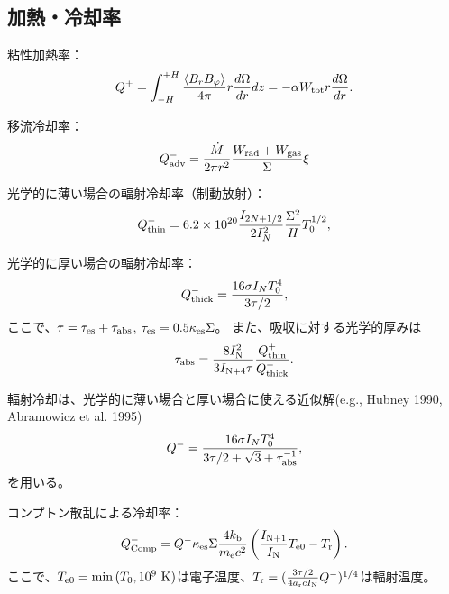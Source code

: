 \documentclass[11pt, oneside]{article}   	%
\begin{document}
\subsection{加熱・冷却率}
粘性加熱率：
\begin{equation}
	Q^+ = \int^{+H}_{-H} \frac{\langle B_rB_\varphi \rangle}{4\pi} r\frac{d\Omega}{dr} dz = -\alpha W_{\rm tot}r\frac{d\Omega}{dr}.
\end{equation}

移流冷却率：
\begin{equation}
	Q^-_{\rm adv} = \frac{\dot{M}}{2\pi r^2} \frac{W_{\rm rad}+W_{\rm gas}}{\Sigma}\xi
\end{equation}

光学的に薄い場合の輻射冷却率（制動放射）：
\begin{equation}
	Q^-_{\rm thin} = 6.2\times10^{20}\frac{I_{2N+1/2}}{2I_N^2}\frac{\Sigma^2}{H}T_0^{1/2},
\end{equation}

光学的に厚い場合の輻射冷却率：
\begin{equation}
	Q^-_{\rm thick} = \frac{16\sigma I_NT_0^4}{3\tau/2},
\end{equation}
ここで、$\tau=\tau_{\rm es}+\tau_{\rm abs}$, $\tau_{\rm es}=0.5\kappa_{\rm es}\Sigma$。
また、吸収に対する光学的厚みは
\begin{equation}
	\tau_{\rm abs} = \frac{8I_{\rm N}^2}{3I_{\rm N+4}\tau}\frac{Q^+_{\rm thin}}{Q^-_{\rm thick}}.
\end{equation}

輻射冷却は、光学的に薄い場合と厚い場合に使える近似解(e.g., Hubney 1990, Abramowicz et al. 1995)
\begin{equation}
	Q^- = \frac{16\sigma I_N T^4_0}{3\tau/2 + \sqrt{3} + \tau_{\rm abs}^{-1}},
\end{equation}
を用いる。

コンプトン散乱による冷却率：
\begin{equation}
	Q^-_{\rm Comp} = Q^-\kappa_{\rm es}\Sigma\frac{4k_{\rm b}}{m_{\rm e}c^2}\left( \frac{I_{\rm N+1}}{I_{\rm N}}T_{\rm e0} - T_{\rm r}\right).
\end{equation}
ここで、$T_{\rm e0}=\min{(T_0, 10^9\ \rm{K})}$は電子温度、$T_{\rm r} = (\frac{3\tau/2}{4a_{\rm r}cI_{\rm N}}Q^-)^{1/4}$は輻射温度。
\end{document}
